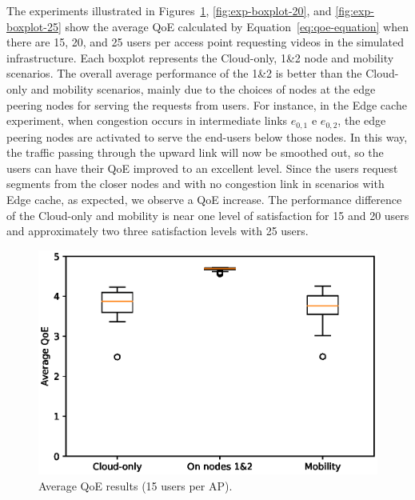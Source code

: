 The experiments illustrated in Figures~\ref{fig:exp-boxplot-15}, \ref{fig:exp-boxplot-20}, and \ref{fig:exp-boxplot-25} show the average QoE calculated by Equation~\ref{eq:qoe-equation} when there are 15, 20, and 25 users per access point requesting videos in the simulated infrastructure. Each boxplot represents the Cloud-only, 1\&2 node and mobility scenarios. The overall average performance of the 1\&2 is better than the Cloud-only and mobility scenarios, mainly due to the choices of nodes at the edge peering nodes for serving the requests from users. 
%
For instance, in the Edge cache experiment, when congestion occurs in intermediate links $e_{0,1}$ e $e_{0,2}$, the edge peering nodes are activated to serve the end-users below those nodes. In this way, the traffic passing through the upward link will now be smoothed out, so the users can have their QoE improved to an excellent level.
%
Since the users request segments from the closer nodes and with no congestion link in scenarios with Edge cache, as expected, we observe a QoE increase. %
%
The performance difference of the Cloud-only and mobility is near one level of satisfaction for 15 and 20 users and approximately two three satisfaction levels with 25 users.


\begin{figure}[!htb]
    \centering
    \includegraphics[width=\linewidth]{images/QoEBoxplot-15u.eps}
    \vspace{-0.7cm}
    \caption{Average QoE results (15 users per AP).}
    \label{fig:exp-boxplot-15}
\end{figure}

